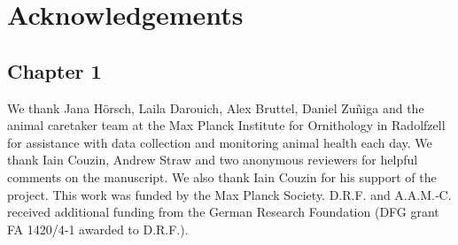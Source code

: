 \documentclass[11pt,a4paper,twoside]{book}
\begin{document}
\begin{doublespace}
\begin{appendices}
\end{appendices}

\pagebreak
\nocite{*}

\renewcommand{\bibname}{References}


\chapter*{Acknowledgements}

\section*{Chapter 1}
We thank Jana Hörsch, Laila Darouich, Alex Bruttel, Daniel Zuñiga and the animal caretaker team at the Max Planck Institute for Ornithology in Radolfzell for assistance with data collection and monitoring animal health each day. We thank Iain Couzin, Andrew Straw and two anonymous reviewers for helpful comments on the manuscript. We also thank Iain Couzin for his support of the project. This work was funded by the Max Planck Society. D.R.F. and A.A.M.‐C. received additional funding from the German Research Foundation (DFG grant FA 1420/4‐1 awarded to D.R.F.).


\end{doublespace}
\end{document}
